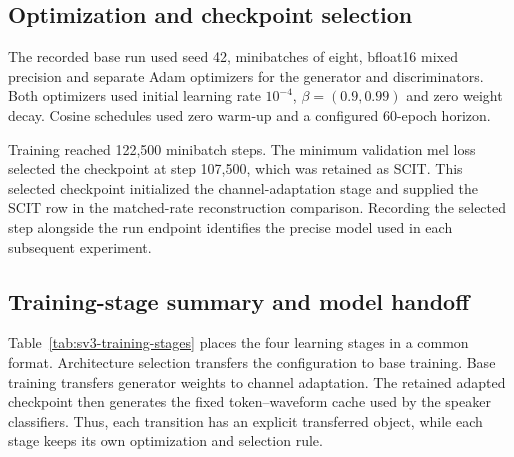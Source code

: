 \subsection{Optimization and checkpoint selection}
The recorded base run used seed 42, minibatches of eight, bfloat16 mixed precision and separate Adam optimizers for the generator and discriminators. Both optimizers used initial learning rate $10^{-4}$, $\beta=(0.9,0.99)$ and zero weight decay. Cosine schedules used zero warm-up and a configured 60-epoch horizon.

Training reached 122,500 minibatch steps. The minimum validation mel loss selected the checkpoint at step 107,500, which was retained as SCIT. This selected checkpoint initialized the channel-adaptation stage and supplied the SCIT row in the matched-rate reconstruction comparison. Recording the selected step alongside the run endpoint identifies the precise model used in each subsequent experiment.

\subsection{Training-stage summary and model handoff}
Table~\ref{tab:sv3-training-stages} places the four learning stages in a common format. Architecture selection transfers the configuration to base training. Base training transfers generator weights to channel adaptation. The retained adapted checkpoint then generates the fixed token--waveform cache used by the speaker classifiers. Thus, each transition has an explicit transferred object, while each stage keeps its own optimization and selection rule.

